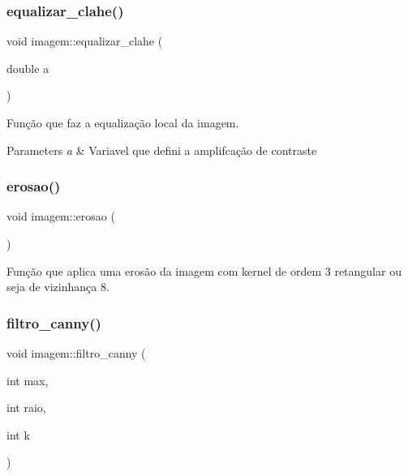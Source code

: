 \subsubsection{\texorpdfstring{equalizar\+\_\+clahe()}{equalizar\_clahe()}}
{\footnotesize\ttfamily void imagem\+::equalizar\+\_\+clahe (\begin{DoxyParamCaption}\item[{double}]{a }\end{DoxyParamCaption})}



Função que faz a equalização local da imagem. 


\begin{DoxyParams}{Parameters}
{\em a} & Variavel que defini a amplifcação de contraste \\
\hline
\end{DoxyParams}
\mbox{\label{classimagem_a7ece85b1d08fdf8090ef0609526580ab}} 
\subsubsection{\texorpdfstring{erosao()}{erosao()}}
{\footnotesize\ttfamily void imagem\+::erosao (\begin{DoxyParamCaption}{ }\end{DoxyParamCaption})}



Função que aplica uma erosão da imagem com kernel de ordem 3 retangular ou seja de vizinhança 8. 

\mbox{\label{classimagem_a42b09a684f856cd47aa638f2878a2c74}} 
\subsubsection{\texorpdfstring{filtro\+\_\+canny()}{filtro\_canny()}}
{\footnotesize\ttfamily void imagem\+::filtro\+\_\+canny (\begin{DoxyParamCaption}\item[{int}]{max,  }\item[{int}]{raio,  }\item[{int}]{k }\end{DoxyParamCaption})}



